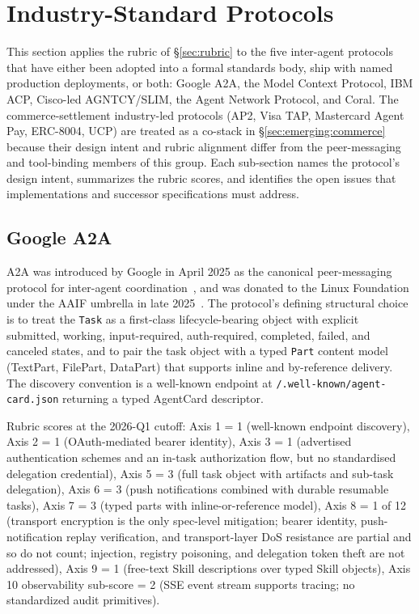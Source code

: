 \section{Industry-Standard Protocols}
\label{sec:industry-protocols}

This section applies the rubric of \S\ref{sec:rubric} to the
five inter-agent protocols that have either been adopted into
a formal standards body, ship with named production
deployments, or both: Google A2A, the Model Context Protocol,
IBM ACP, Cisco-led AGNTCY/SLIM, the Agent Network Protocol,
and Coral. The commerce-settlement industry-led
protocols (AP2, Visa TAP, Mastercard Agent Pay, ERC-8004, UCP) are
treated as a co-stack in \S\ref{sec:emerging:commerce} because
their design intent and rubric alignment differ from the
peer-messaging and tool-binding members of this group. Each
sub-section names the protocol's design intent, summarizes
the rubric scores, and identifies the open issues that
implementations and successor specifications must address.

\subsection{Google A2A}
\label{sec:industry:a2a}

A2A was introduced by Google in April 2025 as the canonical
peer-messaging protocol for inter-agent
coordination~\cite{spec_a2a}, and was donated to the Linux
Foundation under the AAIF umbrella in late 2025~\cite{lf_aaif}.
The protocol's defining structural choice is to treat the
\texttt{Task} as a first-class lifecycle-bearing object with
explicit submitted, working, input-required, auth-required,
completed, failed, and canceled states, and to pair the
task object
with a typed \texttt{Part} content model (TextPart,
FilePart, DataPart) that supports inline and by-reference
delivery. The discovery convention is a well-known endpoint
at \texttt{/.well-known/agent-card.json} returning a typed
AgentCard descriptor.

Rubric scores at the 2026-Q1 cutoff: Axis 1 = 1 (well-known
endpoint discovery), Axis 2 = 1 (OAuth-mediated bearer
identity), Axis 3 = 1 (advertised authentication schemes
and an in-task authorization flow, but no standardised
delegation credential), Axis 5 = 3 (full task object
with artifacts and sub-task delegation), Axis 6 = 3 (push
notifications combined with durable resumable tasks),
Axis 7 = 3 (typed parts with inline-or-reference model),
Axis 8 = 1 of 12 (transport encryption is the only
spec-level mitigation; bearer identity, push-notification
replay verification, and transport-layer DoS resistance are
partial and so do not count; injection, registry poisoning,
and delegation token theft are not addressed), Axis 9 = 1 (free-text Skill
descriptions over typed Skill objects), Axis 10
observability sub-score = 2 (SSE event stream supports
tracing; no standardized audit primitives).

